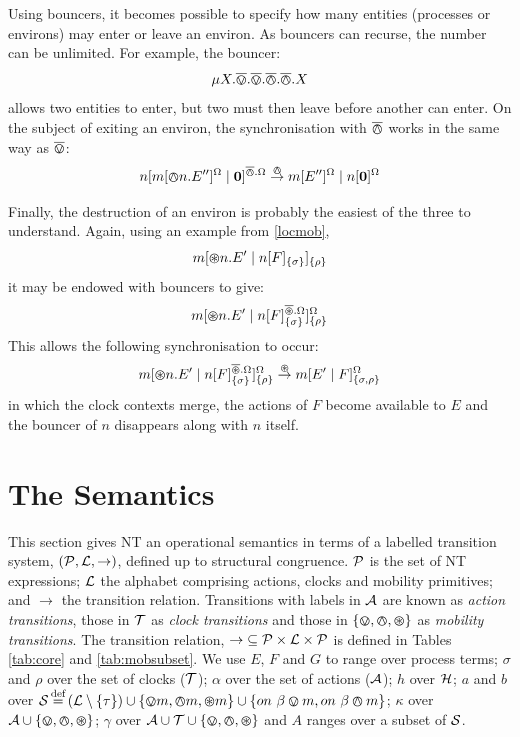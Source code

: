 Using bouncers, it becomes possible to specify how many entities
(processes or environs) may enter or leave an environ.  As bouncers
can recurse, the number can be unlimited.  For example, the bouncer:
\begin{equation}
\mu X.\overline{\varovee}.\overline{\varovee}.\overline{\varowedge}.\overline{\varowedge}.X
\end{equation}
allows two entities to enter, but two must then leave before another
can enter.  On the subject of exiting an environ, the synchronisation
with $\overline{\varowedge}$ works in the same way as $\overline{\varovee}$:
\begin{equation}
{n}[ {m}[ \varowedge n.E^{\prime \prime} ]^{\Omega} \;|\; \textbf{0} ]^{\overline{\varowedge}.\Omega}
 \stackrel{\varowedge}{\rightarrow}
{m}[ E^{\prime \prime} ]^{\Omega} \;|\; {n}[ \textbf{0} ]^{\Omega}
\end{equation}

Finally, the destruction of an environ is probably the easiest of the
three to understand.  Again, using an example from \ref{locmob},
\begin{equation}
{m}[ \varoast n.E^\prime\;|\;{n}[ F ]_{\{\sigma\}} ]_{\{\rho\}}
\end{equation}
it may be endowed with bouncers to give:
\begin{equation}
{m}[ \varoast n.E^\prime \;|\; {n}[ F ]^{\overline{\varoast}.\Omega}_{\{\sigma\}} ]^{\Omega}_{\{\rho\}}
\end{equation}
This allows the following synchronisation to occur:
\begin{equation}
{m}[ \varoast n.E^\prime \;|\; {n}[ F ]^{\overline{\varoast}.\Omega}_{\{\sigma\}} ]^{\Omega}_{\{\rho\}}
\stackrel{\varoast}{\rightarrow}
{m}[ E^\prime \;|\; {F} ]^{\Omega}_{\{\sigma, \rho\}}
\end{equation}
in which the clock contexts merge, the actions of $F$ become
available to $E$ and the bouncer of $n$ disappears along with $n$
itself.

\section{The Semantics}
\label{ntsemantics}

This section gives NT an operational semantics in terms of a labelled
transition system, $(\text{$\mathcal{P}$}, \text{$\mathcal{L}$}, \rightarrow)$, defined up to
structural congruence.  $\text{$\mathcal{P}$}$ is the set of NT expressions;
$\text{$\mathcal{L}$}$ the alphabet comprising actions, clocks and mobility
primitives; and $\rightarrow$ the transition relation.  Transitions
with labels in $\text{$\mathcal{A}$}$ are known as \emph{action transitions},
those in $\text{$\mathcal{T}$}$ as \emph{clock transitions} and those in $\text{$\{ \varovee, \varowedge , \varoast\}$}$
as \emph{mobility transitions}.  The transition relation,
$\mathop{\rightarrow} \mathrel{\subseteq} \text{$\mathcal{P}$} \times \text{$\mathcal{L}$} \times
\text{$\mathcal{P}$}$ is defined in Tables \ref{tab:core} and
\ref{tab:mobsubset}.  We use $E$, $F$ and $G$ to range over process
terms; $\sigma$ and $\rho$ over the set of clocks ($\text{$\mathcal{T}$}$);
$\alpha$ over the set of actions ($\text{$\mathcal{A}$}$); $h$ over $\text{$\mathcal{H}$}$;
$a$ and $b$ over $\text{$\mathcal{S}$} \operatorname{\stackrel{\textrm{def}}{=}} \left(\text{$\mathcal{L}$} \setminus
\{\tau\}\right) \cup \{ \varovee m, \varowedge m, \varoast m \} \cup \{
on\ \beta \varovee m, on\ \beta \varowedge m \} $; $\kappa$ over $\text{$\mathcal{A}$}
\cup \text{$\{ \varovee, \varowedge , \varoast\}$}$; $\gamma$ over $\text{$\mathcal{A}$} \cup \text{$\mathcal{T}$} \cup \text{$\{ \varovee, \varowedge , \varoast\}$}$
and $A$ ranges over a subset of $\text{$\mathcal{S}$}$.

